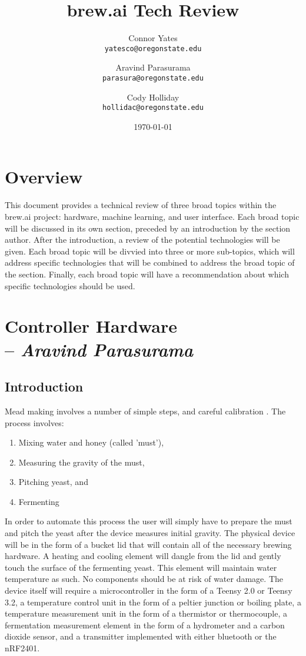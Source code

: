 \documentclass[draftclsnofoot,onecolumn,letterpaper,10pt]{IEEEtran}
\author{Connor Yates\\
\texttt{yatesco@oregonstate.edu\\}
\and
Aravind Parasurama\\
\texttt{parasura@oregonstate.edu\\}
\and
Cody Holliday\\
\texttt{hollidac@oregonstate.edu\\}}
\date{\today}
\title{brew.ai Tech Review}
\begin{document}
\maketitle

\newpage
\tableofcontents
\newpage
\section{Overview}
This document provides a technical review of three broad topics within the brew.ai project: hardware, machine learning, and user interface.
Each broad topic will be discussed in its own section, preceded by an introduction by the section author.
After the introduction, a review of the potential technologies will be given.
Each broad topic will be divvied into three or more sub-topics, which will address specific technologies that will be combined to address the broad topic of the section.
Finally, each broad topic will have a recommendation about which specific technologies should be used.

\section{Controller Hardware \\ -- \textbf{\textit{Aravind Parasurama}}}
\subsection{Introduction}
Mead making involves a number of simple steps, and careful calibration \cite{makingmead}. The process involves: 
\begin{enumerate}
	\item Mixing water and honey (called 'must'),
	\item Measuring the gravity of the must,
	\item Pitching yeast, and
	\item Fermenting
\end{enumerate}
In order to automate this process the user will simply have to prepare the must and pitch the yeast after the device measures initial gravity.
The physical device will be in the form of a bucket lid that will contain all of the necessary brewing hardware. A heating and cooling element will
	dangle from the lid and gently touch the surface of the fermenting yeast. This element will maintain water temperature as such. No components should be at
	risk of water damage.
The device itself will require a microcontroller in the form of a Teensy 2.0 or Teensy 3.2, a temperature control unit in the form of a peltier junction
	or boiling plate, a temperature measurement unit in the form of a thermistor or thermocouple, a fermentation measurement element in the form of a 
	hydrometer and a carbon dioxide sensor, and a transmitter implemented with either bluetooth or the nRF2401.
\end{document}

